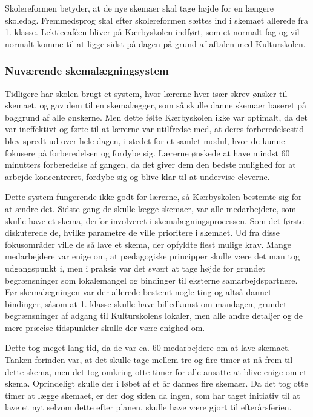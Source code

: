 Skolereformen betyder, at de nye skemaer skal tage højde for en længere skoledag. Fremmedsprog skal efter skolereformen sættes ind i skemaet allerede fra 1. klasse. Lektiecaf\'een bliver på Kærbyskolen indført, som et normalt fag og vil normalt komme til at ligge sidst på dagen på grund af aftalen med Kulturskolen\cite{kaerby_skolereform}.

\subsubsection*{Nuværende skemalægningsystem}
Tidligere har skolen brugt et system, hvor lærerne hver især skrev ønsker til skemaet, og gav dem til en skemalægger, som så skulle danne skemaer baseret på baggrund af alle ønskerne. Men dette følte Kærbyskolen ikke var optimalt, da det var ineffektivt og førte til at lærerne var utilfredse med, at deres forberedelsestid blev spredt ud over hele dagen, i stedet for et samlet modul, hvor de kunne fokusere på forberedelsen og fordybe sig\cite{interview_Kaerby}. Lærerne ønskede at have mindst 60 minutters forberedelse af gangen, da det giver dem den bedste mulighed for at arbejde koncentreret, fordybe sig og blive klar til at undervise eleverne.

Dette system fungerende ikke godt for lærerne, så Kærbyskolen bestemte sig for at ændre det. Sidste gang de skulle lægge skemaer, var alle medarbejdere, som skulle have et skema, derfor involveret i skemalægningsprocessen. Som det første diskuterede de, hvilke parametre de ville prioritere i skemaet. Ud fra disse fokusområder ville de så lave et skema, der opfyldte flest mulige krav. Mange medarbejdere var enige om, at pædagogiske principper skulle være det man tog udgangspunkt i, men i praksis var det svært at tage højde for grundet begrænsninger som lokalemangel og bindinger til eksterne samarbejdspartnere. Før skemalægningen var der allerede bestemt nogle ting og altså dannet bindinger, såsom at 1. klasse skulle have billedkunst om mandagen, grundet begrænsninger af adgang til Kulturskolens lokaler, men alle andre detaljer og de mere præcise tidspunkter skulle der være enighed om. 

Dette tog meget lang tid, da de var ca. 60 medarbejdere om at lave skemaet. Tanken forinden var, at det skulle tage mellem tre og fire timer at nå frem til dette skema, men det tog omkring otte timer for alle ansatte at blive enige om et skema. Oprindeligt skulle der i løbet af et år dannes fire skemaer. Da det tog otte timer at lægge skemaet, er der dog siden da ingen, som har taget initiativ til at lave et nyt selvom dette efter planen, skulle have være gjort til efterårsferien.


